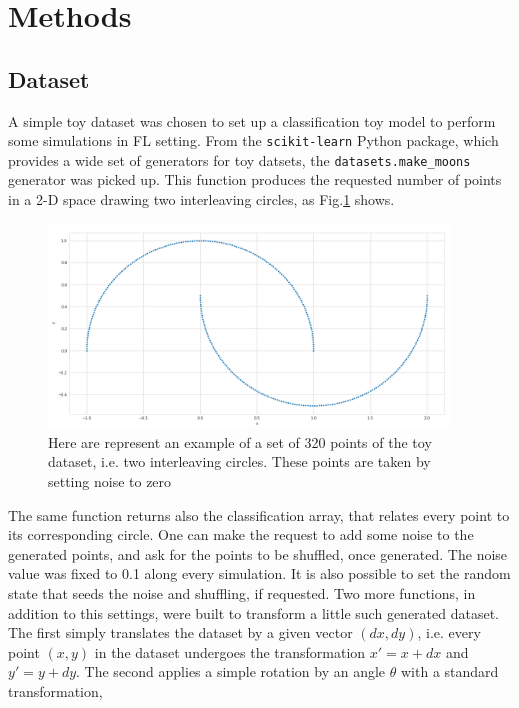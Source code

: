 \documentclass{article} %
\newcounter{points}
\newcounter{late}
\begin{document}
\section {Methods}

\subsection{Dataset}
A simple toy dataset was chosen to set up a classification toy model to perform some 
simulations in FL setting.
From the \verb|scikit-learn| Python package, which provides a wide set of generators 
for toy datsets, the \verb|datasets.make_moons| generator was picked up.
This function produces the requested number of points in a 2-D space drawing two 
interleaving circles, as Fig.\ref{fig1} shows.
\begin{figure}[!h]
    \centering
    \includegraphics[width=0.95\textwidth, keepaspectratio]{images/make_moons_example.png}
    \caption{Here are represent an example of a set of 320 points of the toy dataset, i.e.
        two interleaving circles. These points are taken by setting noise to zero}
    \label{fig1}
\end{figure}
The same function returns also the classification array, that relates every point to 
its corresponding circle.
One can make the request to add some noise to the generated points, and ask for the 
points to be shuffled, once generated.
The noise value was fixed to 0.1 along every simulation.
It is also possible to set the random state that seeds the noise and shuffling, if 
requested.
Two more functions, in addition to this settings, were built to transform a little 
such generated dataset.
The first simply translates the dataset by a given vector $(dx, dy)$, i.e. every 
point $(x, y)$ in the dataset undergoes the transformation $x'=x+dx$ and $y'=y+dy$.
The second applies a simple rotation by an angle $\theta$ with a standard transformation,
\end{document}
